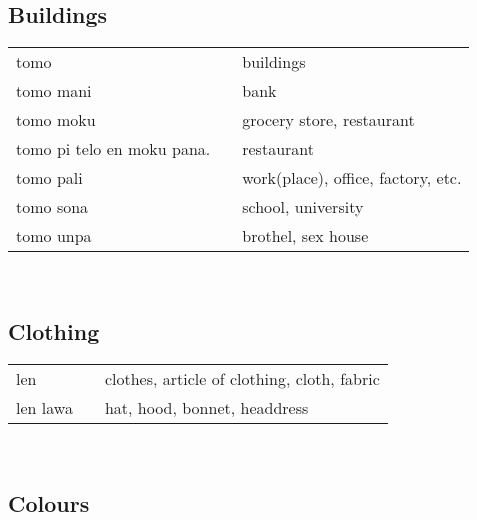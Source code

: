 \subsection{Buildings}

\begin{supertabular}{p{4,5cm}|ll}
    tomo                       &  & buildings                          \\
    tomo mani                  &  & bank                               \\
    tomo moku                  &  & grocery store, restaurant          \\
    tomo pi telo en moku pana. &  & restaurant                         \\
    tomo pali                  &  & work(place), office, factory, etc. \\
    tomo sona                  &  & school, university                 \\
    tomo unpa                  &  & brothel, sex house                 \\
\end{supertabular} \\

\subsection{Clothing}

\begin{supertabular}{p{4,5cm}|ll}
    len      &  & clothes, article of clothing, cloth, fabric \\
    len lawa &  & hat, hood, bonnet, headdress                \\
\end{supertabular} \\

\subsection{Colours}

